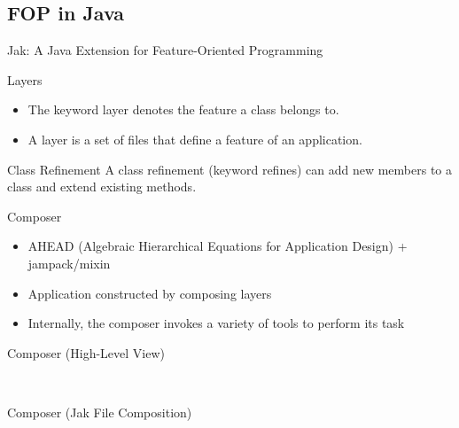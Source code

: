 \subsection{FOP in Java}

\begin{frame}{Jak: A Java Extension for Feature-Oriented Programming }
	\begin{mycolumns}[widths={50,50},animation=none]
		\begin{definition}{Layers}
			\begin{itemize}
				\item The keyword layer denotes the feature a class belongs to.
				\item A layer is a set of files that define a feature of an application.
			\end{itemize}
		\end{definition}
		\begin{definition}{Class Refinement}
			A class refinement (keyword refines) can add new members to a class and extend existing methods. 
		\end{definition}
		\begin{definition}{Composer}
			\begin{itemize}
				\item AHEAD (Algebraic Hierarchical Equations for Application Design) + jampack/mixin
				\item Application constructed by composing layers
				\item Internally, the composer invokes a variety of tools to perform its task
			\end{itemize}
		\end{definition}
	\mynextcolumn
		\begin{exampletight}{Composer (High-Level View)}
			\centering
		\end{exampletight}
		
		~
		
		\begin{exampletight}{Composer (Jak File Composition)}
			\centering
		\end{exampletight}
	\end{mycolumns}
\end{frame}

